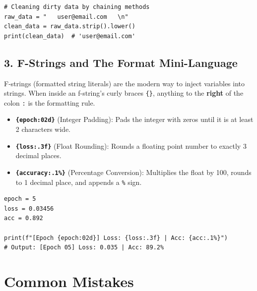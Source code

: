 \begin{lstlisting}
# Cleaning dirty data by chaining methods
raw_data = "   user@email.com   \n"
clean_data = raw_data.strip().lower()
print(clean_data)  # 'user@email.com'
\end{lstlisting}

\subsection{3. F-Strings and The Format Mini-Language}
F-strings (formatted string literals) are the modern way to inject variables into strings. When inside an f-string's curly braces \texttt{\{\}}, anything to the \textbf{right} of the colon \texttt{:} is the formatting rule.

\begin{itemize}
    \item \textbf{\texttt{\{epoch:02d\}}} (Integer Padding): Pads the integer with zeros until it is at least 2 characters wide.
    \item \textbf{\texttt{\{loss:.3f\}}} (Float Rounding): Rounds a floating point number to exactly 3 decimal places.
    \item \textbf{\texttt{\{accuracy:.1\%\}}} (Percentage Conversion): Multiplies the float by 100, rounds to 1 decimal place, and appends a \texttt{\%} sign.
\end{itemize}

\begin{lstlisting}
epoch = 5
loss = 0.03456
acc = 0.892

print(f"[Epoch {epoch:02d}] Loss: {loss:.3f} | Acc: {acc:.1%}")
# Output: [Epoch 05] Loss: 0.035 | Acc: 89.2%
\end{lstlisting}

\section{Common Mistakes}


